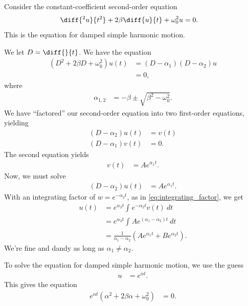 \documentclass[10pt]{mypackage}
\begin{document}
  \begin{example}
    Consider the constant-coefficient second-order equation
    \begin{align*}
      \diff{^2u}{t^2} + 2\beta \diff{u}{t} + \omega_0^2u &= 0.
    \end{align*}
    This is the equation for damped simple harmonic motion.\newline

    We let $D = \diff{}{t}$. We have the equation
    \begin{align*}
      \left( D^2 + 2\beta D + \omega_0^2 \right)u(t) &= \left( D-\alpha_1 \right)\left( D-\alpha_2 \right)u\\
                                                     &= 0,
    \end{align*}
    where
    \begin{align*}
      \alpha_{1,2} &= -\beta \pm \sqrt{\beta^2 - \omega_0^2}.
    \end{align*}
    We have ``factored'' our second-order equation into two first-order equations, yielding
    \begin{align*}
      \left( D-\alpha_2 \right) u(t) &= v(t)\\
      \left( D-\alpha_1 \right)v(t) &= 0.
    \end{align*}
    The second equation yields
    \begin{align*}
      v(t) &= Ae^{\alpha_1 t}.
    \end{align*}
    Now, we must solve
    \begin{align*}
      \left( D-\alpha_2 \right)u(t) &= Ae^{\alpha_1 t}.
    \end{align*}
    With an integrating factor of $w = e^{-\alpha_2 t}$, as in \eqref{eq:integrating_factor}, we get
    \begin{align*}
      u(t) &= e^{\alpha_2 t} \int_{}^{} e^{-\alpha_2 t}v(t)\:dt\\
           &= e^{\alpha_2 t} \int_{}^{} Ae^{\left( \alpha_1 - \alpha_2 \right)t}\:dt\\
           &= \frac{1}{\alpha_1 - \alpha_2} \left( Ae^{\alpha_1 t} + Be^{\alpha_2 t} \right).
    \end{align*}
    We're fine and dandy as long as $\alpha_1\neq \alpha_2$.
  \end{example}
  \begin{example}
    To solve the equation for damped simple harmonic motion, we use the guess
    \begin{align*}
      u &= e^{\alpha t}.
    \end{align*}
    This gives the equation
    \begin{align*}
      e^{\alpha t}\left( \alpha^2 + 2\beta\alpha + \omega_0^2 \right) &= 0.
    \end{align*}
  \end{example}
\end{document}
